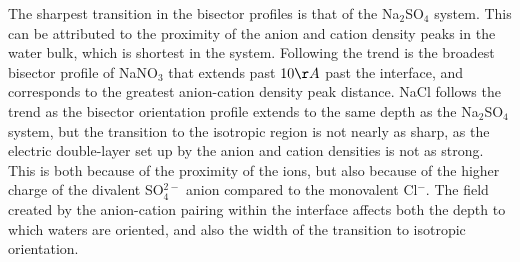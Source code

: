 The sharpest transition in the bisector profiles is that of the Na$_2$SO$_4$ system. This can be attributed to the proximity of the anion and cation density peaks in the water bulk, which is shortest in the system. Following the trend is the broadest bisector profile of NaNO$_3$ that extends past $10\AA$ past the interface, and corresponds to the greatest anion-cation density peak distance. NaCl follows the trend as the bisector orientation profile extends to the same depth as the Na$_2$SO$_4$ system, but the transition to the isotropic region is not nearly as sharp, as the electric double-layer set up by the anion and cation densities is not as strong. This is both because of the proximity of the ions, but also because of the higher charge of the divalent SO$_4^{2-}$ anion compared to the monovalent Cl$^-$. The field created by the anion-cation pairing within the interface affects both the depth to which waters are oriented, and also the width of the transition to isotropic orientation.

